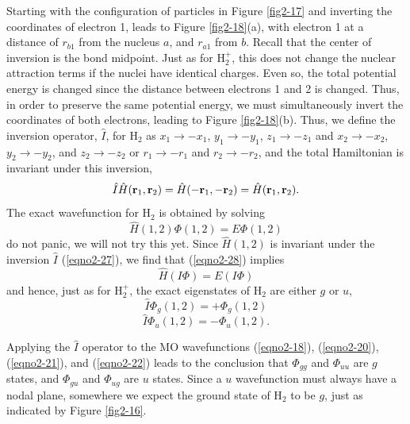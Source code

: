 Starting with the configuration of particles in Figure \ref{fig2-17}
and inverting the coordinates of electron 1, leads to Figure
\ref{fig2-18}(a), with electron 1 at a distance of $r_{b1}$ from the
nucleus $a$, and $r_{a1}$ from $b$.  Recall that the center of
inversion is the bond midpoint. Just as for H$^+_2$, this does not
change the nuclear attraction terms if the nuclei have identical
charges.  Even so, the total potential energy is changed since the
distance between electrons 1 and 2 is changed. Thus, in order to
preserve the same potential energy, we must simultaneously invert the
coordinates of both electrons, leading to Figure
\ref{fig2-18}(b). Thus, we define the inversion operator, ${\hat I}$,
for H$_2$ as $x_1 \rightarrow - x_1$, $y_1 \rightarrow - y_1$, $z_1
\rightarrow - z_1$ and $x_2 \rightarrow - x_2$, $y_2 \rightarrow -
y_2$, and $z_2 \rightarrow - z_2$ or $r_1 \rightarrow - r_1$ and $r_2
\rightarrow -r_2$, and the total Hamiltonian is invariant under this
inversion,
\begin{equation}
{\hat I} {\hat H} ( {\bf r}_1 , {\bf r}_2 ) = {\hat H} ( - {\bf 
r}_1 , - {\bf r}_2 ) = {\hat H} ( {\bf r}_1 , {\bf r}_2 ).
\label{eqno2-27}
\end{equation}
The exact wavefunction for H$_2$ is obtained by solving
\begin{equation}
{\hat H} ( 1 , 2 ) \Phi ( 1 , 2 ) = E \Phi ( 1 , 2 )
\label{eqno2-28}
\end{equation}
do not panic, we will not try this yet. Since ${\hat H}(1, 2)$ is
invariant under the inversion ${\hat I}$ (\ref{eqno2-27}), we find
that (\ref{eqno2-28}) implies
\begin{equation}
{\hat H} ( I \Phi ) = E ( I \Phi )
\end{equation}
and hence, just as for H$^+_2$, the exact eigenstates of H$_2$ are 
either $g$ or $u$,
\begin{equation}
{\hat I} \Phi_g ( 1 , 2 ) = + \Phi_g ( 1 , 2 )
\end{equation}
\begin{equation}
{\hat I} \Phi_u ( 1 , 2 ) = - \Phi_u ( 1 , 2 ).
\end{equation}

Applying the ${\hat I}$ operator to the MO wavefunctions
(\ref{eqno2-18}), (\ref{eqno2-20}), (\ref{eqno2-21}), and
(\ref{eqno2-22}) leads to the conclusion that $\Phi_{gg}$ and
$\Phi_{uu}$ are $g$ states, and $\Phi_{gu}$ and $\Phi_{ug}$ are $u$
states. Since a $u$ wavefunction must always have a nodal plane,
somewhere we expect the ground state of H$_2$ to be $g$, just as
indicated by Figure \ref{fig2-16}.

